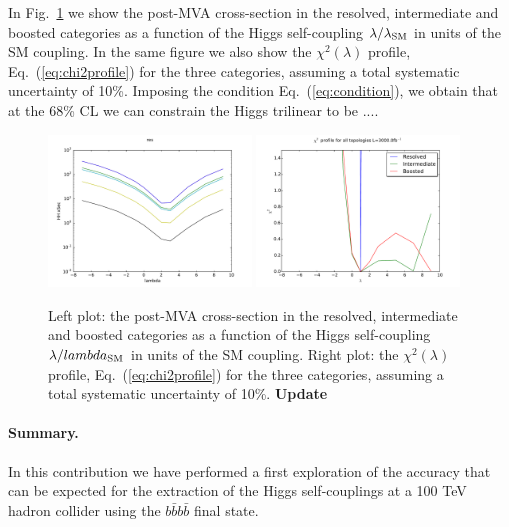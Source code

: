 \documentclass[a4paper,11pt]{article}
\begin{document}
In Fig.~\ref{fig:chi2} we show the post-MVA cross-section in the resolved, intermediate
  and boosted categories as a function of the Higgs self-coupling
  $\lambda/\lambda_{\rm SM}$ in units of the SM coupling.
  In the same figure we also show the $\chi^2(\lambda)$ profile, Eq.~(\ref{eq:chi2profile})
  for the three categories, assuming a total systematic uncertainty of
  10\%.
  Imposing the condition Eq.~(\ref{eq:condition}), we obtain that at the 68\% CL we can constrain the
  Higgs trilinear to be ....

\begin{figure}[t]
\begin{center}
\includegraphics[width=0.48\textwidth]{plots/res.pdf}
\includegraphics[width=0.48\textwidth]{plots/chi2.pdf}
\caption{\small
  Left plot: the post-MVA cross-section in the resolved, intermediate
  and boosted categories as a function of the Higgs self-coupling
  $\lambda/lambda_{\rm SM}$ in units of the SM coupling.
  Right plot: the $\chi^2(\lambda)$ profile, Eq.~(\ref{eq:chi2profile})
  for the three categories, assuming a total systematic uncertainty of
  10\%.
  {\bf Update}
}
\label{fig:chi2}
\end{center}
\end{figure}
  
\paragraph{Summary.} In this contribution we have performed a first exploration of the accuracy that can be expected
for the extraction of the Higgs self-couplings at a 100 TeV hadron collider using the $b\bar{b}b\bar{b}$ final state. 



\end{document}
